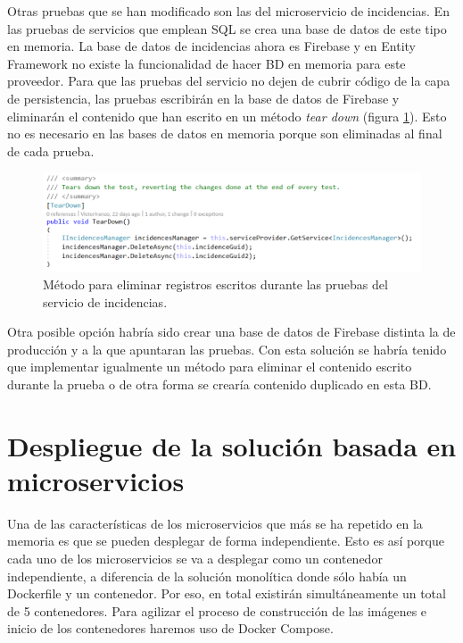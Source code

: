\documentclass[11pt,spanish,listoffigures]{tfgetsinf}
\begin{document}
Otras pruebas que se han modificado son las del microservicio de incidencias. En las pruebas de servicios que emplean SQL se crea una base de datos de este tipo en memoria. La base de datos de incidencias ahora es Firebase y en Entity Framework no existe la funcionalidad de hacer BD en memoria para este proveedor. Para que las pruebas del servicio no dejen de cubrir código de la capa de persistencia, las pruebas escribirán en la base de datos de Firebase y eliminarán el contenido que han escrito en un método \textit{tear down} (figura \ref{fig:TearDown}). Esto no es necesario en las bases de datos en memoria porque son eliminadas al final de cada prueba.

\begin{figure}[h]
\centering
\includegraphics[scale=0.6]{TearDown}
\caption{Método para eliminar registros escritos durante las pruebas del servicio de incidencias.}
\label{fig:TearDown}
\end{figure}

Otra posible opción habría sido crear una base de datos de Firebase distinta la de producción y a la que apuntaran las pruebas. Con esta solución se habría tenido que implementar igualmente un método para eliminar el contenido escrito durante la prueba o de otra forma se crearía contenido duplicado en esta BD.

\section{Despliegue de la solución basada en microservicios} \label{sect:DespliegueMicroservicios}

Una de las características de los microservicios que más se ha repetido en la memoria es que se pueden desplegar de forma independiente. Esto es así porque cada uno de los microservicios se va a desplegar como un contenedor independiente, a diferencia de la solución monolítica donde sólo había un Dockerfile y un contenedor. Por eso, en total existirán simultáneamente un total de 5 contenedores. Para agilizar el proceso de construcción de las imágenes e inicio de los contenedores haremos uso de Docker Compose. 
\end{document}
